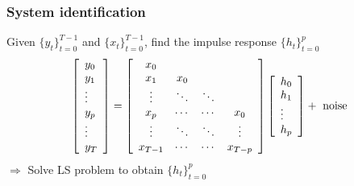 \begin{multicols}{2}
\subsubsection{System identification}
Given $\{y_t\}_{t=0}^{T-1}$ and $\{x_t\}_{t=0}^{T-1}$, find the impulse response $\{h_t\}_{t=0}^{p}$
\[
    \left[\begin{array}{l}
        y_0 \\
        y_1 \\
        \vdots \\
        y_p \\
        \vdots \\
        y_T
    \end{array}
    \right]
    =
    \left[\begin{array}{cccc}
        x_0 &     & &\\
        x_1 & x_0 && \\
        \vdots & \ddots& \ddots & \\
        x_p& \cdots& \cdots & x_0 \\
        \vdots &  \ddots&\ddots & \vdots \\
        x_{T-1} & \cdots&\cdots & x_{T-p}
    \end{array}
    \right]
    \left[\begin{array}{l}
        h_0 \\
        h_1 \\
        \vdots \\
        h_p
    \end{array}
    \right]
    +
    \text{ \rm noise}
\]
$\Longrightarrow$ Solve LS problem to obtain $\{h_t\}_{t=0}^{p}$

\end{multicols}
